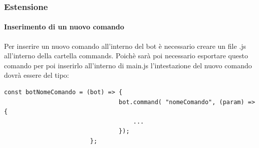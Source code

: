 \subsubsection{Estensione}
	\paragraph{Inserimento di un nuovo comando}
		Per inserire un nuovo comando all'interno del bot è necessario creare un file .js all'interno della cartella commands. Poichè sarà poi necessario esportare questo comando per poi inserirlo all'interno di main.js l'intestazione del nuovo comando dovrà essere del tipo:
		\begin{verbatim}const botNomeComando = (bot) => {
								bot.command( "nomeComando", (param) => {
							 		...
							 	});
						}; 
		\end{verbatim}	
